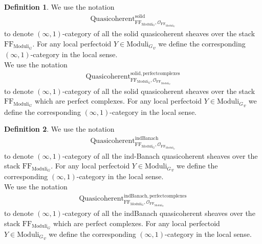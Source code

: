 \documentclass[12pt]{book}
\theoremstyle{definition}
\newtheorem{definition}{Definition}
\begin{document}
\begin{definition}
We use the notation
\begin{align}
\mathrm{Quasicoherent}^{\mathrm{solid}}_{\mathrm{FF}_{\mathrm{Moduli}_G},\mathcal{O}_{\mathrm{FF}_{\mathrm{Moduli}_G}}}
\end{align}
to denote $(\infty,1)$-category of all the solid quasicoherent sheaves over the stack $\mathrm{FF}_{\mathrm{Moduli}_G}$. For any local perfectoid $Y\in {\mathrm{Moduli}_G}_v$ we define the corresponding $(\infty,1)$-category in the local sense.\\
We use the notation
\begin{align}
\mathrm{Quasicoherent}^{\mathrm{solid,perfectcomplexes}}_{\mathrm{FF}_{\mathrm{Moduli}_G},\mathcal{O}_{\mathrm{FF}_{\mathrm{Moduli}_G}}}
\end{align}
to denote $(\infty,1)$-category of all the solid quasicoherent sheaves over the stack $\mathrm{FF}_{\mathrm{Moduli}_G}$ which are perfect complexes. For any local perfectoid $Y\in {\mathrm{Moduli}_G}_v$ we define the corresponding $(\infty,1)$-category in the local sense.
\end{definition}


\begin{definition}
We use the notation
\begin{align}
\mathrm{Quasicoherent}^{\mathrm{indBanach}}_{\mathrm{FF}_{\mathrm{Moduli}_G},\mathcal{O}_{\mathrm{FF}_{\mathrm{Moduli}_G}}}
\end{align}
to denote $(\infty,1)$-category of all the ind-Banach quasicoherent sheaves over the stack $\mathrm{FF}_{\mathrm{Moduli}_G}$. For any local perfectoid $Y\in {\mathrm{Moduli}_G}_v$ we define the corresponding $(\infty,1)$-category in the local sense.\\
We use the notation
\begin{align}
\mathrm{Quasicoherent}^{\mathrm{indBanach,perfectcomplexes}}_{\mathrm{FF}_{\mathrm{Moduli}_G},\mathcal{O}_{\mathrm{FF}_{\mathrm{Moduli}_G}}}
\end{align}
to denote $(\infty,1)$-category of all the indBanach quasicoherent sheaves over the stack $\mathrm{FF}_{\mathrm{Moduli}_G}$ which are perfect complexes. For any local perfectoid $Y\in {\mathrm{Moduli}_G}_v$ we define the corresponding $(\infty,1)$-category in the local sense.
\end{definition}
\end{document}
